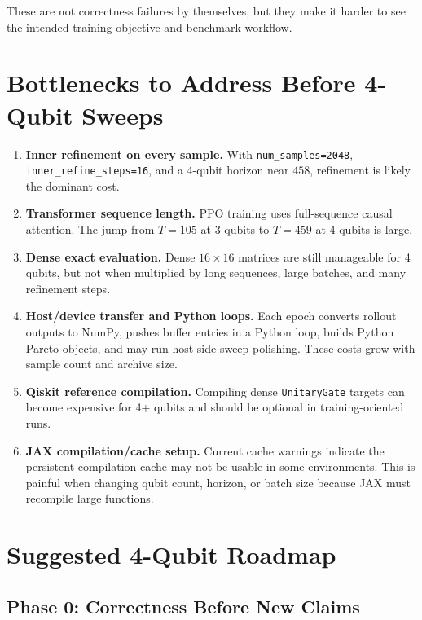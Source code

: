 \documentclass[11pt]{article}
\begin{document}
These are not correctness failures by themselves, but they make it harder to see
the intended training objective and benchmark workflow.

\section{Bottlenecks to Address Before 4-Qubit Sweeps}

\begin{enumerate}[leftmargin=*]
  \item \textbf{Inner refinement on every sample.}  With
  \texttt{num\_samples=2048}, \texttt{inner\_refine\_steps=16}, and a 4-qubit
  horizon near \(458\), refinement is likely the dominant cost.

  \item \textbf{Transformer sequence length.}  PPO training uses full-sequence
  causal attention.  The jump from \(T=105\) at 3 qubits to \(T=459\) at 4
  qubits is large.

  \item \textbf{Dense exact evaluation.}  Dense \(16 \times 16\) matrices are
  still manageable for 4 qubits, but not when multiplied by long sequences, large
  batches, and many refinement steps.

  \item \textbf{Host/device transfer and Python loops.}  Each epoch converts
  rollout outputs to NumPy, pushes buffer entries in a Python loop, builds Python
  Pareto objects, and may run host-side sweep polishing.  These costs grow with
  sample count and archive size.

  \item \textbf{Qiskit reference compilation.}  Compiling dense
  \texttt{UnitaryGate} targets can become expensive for 4+ qubits and should be
  optional in training-oriented runs.

  \item \textbf{JAX compilation/cache setup.}  Current cache warnings indicate
  the persistent compilation cache may not be usable in some environments.  This
  is painful when changing qubit count, horizon, or batch size because JAX must
  recompile large functions.
\end{enumerate}

\section{Suggested 4-Qubit Roadmap}

\subsection{Phase 0: Correctness Before New Claims}
\end{document}
